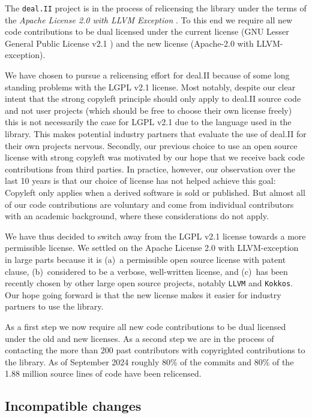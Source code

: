 \documentclass{ansarticle-preprint}
\newcommand{\specialword}[1]{\texttt{#1}}
\newcommand{\dealii}{{\specialword{deal.II}}\xspace}
\newcommand{\kokkos}{{\specialword{Kokkos}}\xspace}
\newcommand{\llvm}{{\specialword{LLVM}}\xspace}
\begin{document}
The \dealii project is in the process of relicensing the library under the
terms of the \emph{Apache License 2.0 with LLVM
Exception} \cite{Apache-2.0,LLVM-Exception}. To this end we require all new
code contributions to be dual licensed under the current license (GNU
Lesser General Public License v2.1 \cite{LGPL-2.1}) and the new license
(Apache-2.0 with LLVM-exception).

We have chosen to pursue a relicensing effort for deal.II because of some
long standing problems with the LGPL v2.1 license. Most notably, despite
our clear intent that the strong copyleft principle should only apply to
deal.II source code and not user projects (which should be free to choose
their own license freely) this is not necessarily the case for LGPL v2.1
due to the language used in the library. This makes potential industry
partners that evaluate the use of deal.II for their own projects nervous.
Secondly, our previous choice to use an open source license with strong
copyleft was motivated by our hope that we receive back code contributions
from third parties. In practice, however, our observation over the
last 10 years is that our choice of license has not helped achieve this goal:
Copyleft only applies when a derived software is sold or published. But almost
all of our code contributions are voluntary and come from individual contributors
with an academic background, where these considerations do not apply.

We have thus decided to switch away from the LGPL v2.1 license towards a
more permissible license. We settled on the Apache License 2.0 with
LLVM-exception in large parts because it is (a)~a permissible open source
license with patent clause, (b)~considered to be a verbose, well-written
license, and (c)~has been recently chosen by other large open source
projects, notably \llvm{} and \kokkos{}. Our hope going forward is
that the new license makes it easier for industry partners to use the library.

As a first step we now require all new code contributions to be dual
licensed under the old and new licenses. As a second step we are in the
process of contacting the more than 200 past contributors with copyrighted
contributions to the library. As of September 2024 roughly 80\% of the
commits and 80\% of the 1.88 million source lines of code have been
relicensed.

\subsection{Incompatible changes}\label{subsec:deprecated}
\end{document}
